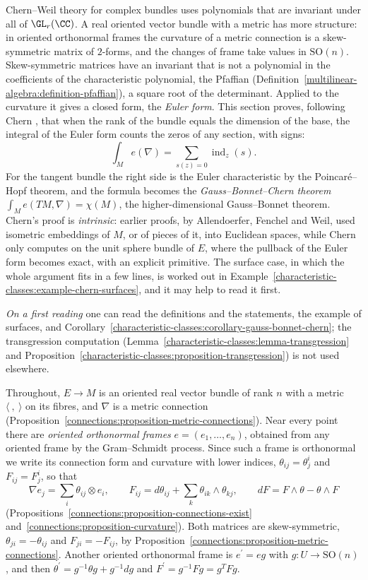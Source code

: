Chern--Weil theory for complex bundles uses polynomials that are invariant under all of $\GL_r(\CC)$. A real oriented vector bundle with a metric has more structure: in oriented
orthonormal frames the curvature of a metric connection is a skew-symmetric matrix of $2$-forms, and the changes of frame take values in $\mathrm{SO}(n)$. Skew-symmetric matrices have
an invariant that is not a polynomial in the coefficients of the characteristic polynomial, the Pfaffian (Definition~\ref{multilinear-algebra:definition-pfaffian}), a square root of the
determinant. Applied to the curvature it gives a closed form, the \emph{Euler form}. This section proves, following Chern \cite{chern-1944}, that when the rank of the bundle equals the
dimension of the base, the integral of the Euler form counts the zeros of any section, with signs:
\[
\int_Me(\nabla) = \sum_{s(z) = 0}\operatorname{ind}_z(s) .
\]
For the tangent bundle the right side is the Euler characteristic by the Poincar\'e--Hopf theorem, and the formula becomes the \emph{Gauss--Bonnet--Chern theorem}
$\int_Me(TM, \nabla) = \chi(M)$, the higher-dimensional Gauss--Bonnet theorem. Chern's proof is \emph{intrinsic}: earlier proofs, by Allendoerfer, Fenchel and Weil, used isometric embeddings of $M$, or of
pieces of it, into Euclidean spaces, while Chern only computes on the unit sphere bundle of $E$, where the pullback of the Euler form becomes exact, with an explicit primitive. The surface case, in which the whole argument fits in a few
lines, is worked out in Example~\ref{characteristic-classes:example-chern-surfaces}, and it may help to read it first.

\emph{On a first reading} one can read the definitions and the statements, the example of surfaces, and Corollary~\ref{characteristic-classes:corollary-gauss-bonnet-chern}; the
transgression computation (Lemma~\ref{characteristic-classes:lemma-transgression} and Proposition~\ref{characteristic-classes:proposition-transgression}) is not used elsewhere.

Throughout, $E \to M$ is an oriented real vector bundle of rank $n$ with a metric $\langle\ ,\ \rangle$ on its fibres, and $\nabla$ is a metric connection
(Proposition~\ref{connections:proposition-metric-connections}). Near every point there are \emph{oriented orthonormal frames} $e = (e_1, \ldots, e_n)$, obtained from any oriented frame by
the Gram--Schmidt process. Since such a frame is orthonormal we write its connection form and curvature with lower indices, $\theta_{ij} = \theta^i_j$ and $F_{ij} = F^i_j$, so that
\[
\nabla e_j = \sum_i\theta_{ij} \otimes e_i, \qquad F_{ij} = d\theta_{ij} + \sum_k\theta_{ik} \wedge \theta_{kj}, \qquad dF = F \wedge \theta - \theta \wedge F
\]
(Propositions~\ref{connections:proposition-connections-exist} and~\ref{connections:proposition-curvature}). Both matrices are skew-symmetric, $\theta_{ji} = -\theta_{ij}$ and
$F_{ji} = -F_{ij}$, by Proposition~\ref{connections:proposition-metric-connections}. Another oriented orthonormal frame is $e^{\prime} = eg$ with $g \colon U \to \mathrm{SO}(n)$, and then
$\theta^{\prime} = g^{-1}\theta g + g^{-1}dg$ and $F^{\prime} = g^{-1}Fg = g^TFg$.

